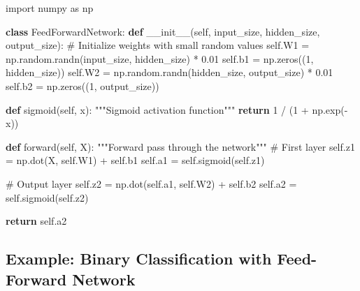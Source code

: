 \documentclass[
  letterpaper,
  DIV=11,
  numbers=noendperiod]{scrreprt}
\newenvironment{Shaded}{\begin{snugshade}}{\end{snugshade}}
\newcommand{\CommentTok}[1]{\textcolor[rgb]{0.37,0.37,0.37}{#1}}
\newcommand{\ControlFlowTok}[1]{\textcolor[rgb]{0.00,0.23,0.31}{\textbf{#1}}}
\newcommand{\DecValTok}[1]{\textcolor[rgb]{0.68,0.00,0.00}{#1}}
\newcommand{\FloatTok}[1]{\textcolor[rgb]{0.68,0.00,0.00}{#1}}
\newcommand{\FunctionTok}[1]{\textcolor[rgb]{0.28,0.35,0.67}{#1}}
\newcommand{\ImportTok}[1]{\textcolor[rgb]{0.00,0.46,0.62}{#1}}
\newcommand{\KeywordTok}[1]{\textcolor[rgb]{0.00,0.23,0.31}{\textbf{#1}}}
\newcommand{\NormalTok}[1]{\textcolor[rgb]{0.00,0.23,0.31}{#1}}
\newcommand{\OperatorTok}[1]{\textcolor[rgb]{0.37,0.37,0.37}{#1}}
\newcommand{\VariableTok}[1]{\textcolor[rgb]{0.07,0.07,0.07}{#1}}
\begin{document}
\begin{Shaded}
\begin{Highlighting}[]
\ImportTok{import}\NormalTok{ numpy }\ImportTok{as}\NormalTok{ np}

\KeywordTok{class}\NormalTok{ FeedForwardNetwork:}
    \KeywordTok{def} \FunctionTok{\_\_init\_\_}\NormalTok{(}\VariableTok{self}\NormalTok{, input\_size, hidden\_size, output\_size):}
        \CommentTok{\# Initialize weights with small random values}
        \VariableTok{self}\NormalTok{.W1 }\OperatorTok{=}\NormalTok{ np.random.randn(input\_size, hidden\_size) }\OperatorTok{*} \FloatTok{0.01}
        \VariableTok{self}\NormalTok{.b1 }\OperatorTok{=}\NormalTok{ np.zeros((}\DecValTok{1}\NormalTok{, hidden\_size))}
        \VariableTok{self}\NormalTok{.W2 }\OperatorTok{=}\NormalTok{ np.random.randn(hidden\_size, output\_size) }\OperatorTok{*} \FloatTok{0.01}
        \VariableTok{self}\NormalTok{.b2 }\OperatorTok{=}\NormalTok{ np.zeros((}\DecValTok{1}\NormalTok{, output\_size))}
    
    \KeywordTok{def}\NormalTok{ sigmoid(}\VariableTok{self}\NormalTok{, x):}
        \CommentTok{"""Sigmoid activation function"""}
        \ControlFlowTok{return} \DecValTok{1} \OperatorTok{/}\NormalTok{ (}\DecValTok{1} \OperatorTok{+}\NormalTok{ np.exp(}\OperatorTok{{-}}\NormalTok{x))}
    
    \KeywordTok{def}\NormalTok{ forward(}\VariableTok{self}\NormalTok{, X):}
        \CommentTok{"""Forward pass through the network"""}
        \CommentTok{\# First layer}
        \VariableTok{self}\NormalTok{.z1 }\OperatorTok{=}\NormalTok{ np.dot(X, }\VariableTok{self}\NormalTok{.W1) }\OperatorTok{+} \VariableTok{self}\NormalTok{.b1}
        \VariableTok{self}\NormalTok{.a1 }\OperatorTok{=} \VariableTok{self}\NormalTok{.sigmoid(}\VariableTok{self}\NormalTok{.z1)}
        
        \CommentTok{\# Output layer}
        \VariableTok{self}\NormalTok{.z2 }\OperatorTok{=}\NormalTok{ np.dot(}\VariableTok{self}\NormalTok{.a1, }\VariableTok{self}\NormalTok{.W2) }\OperatorTok{+} \VariableTok{self}\NormalTok{.b2}
        \VariableTok{self}\NormalTok{.a2 }\OperatorTok{=} \VariableTok{self}\NormalTok{.sigmoid(}\VariableTok{self}\NormalTok{.z2)}
        
        \ControlFlowTok{return} \VariableTok{self}\NormalTok{.a2}
\end{Highlighting}
\end{Shaded}

\subsection{Example: Binary Classification with Feed-Forward
Network}\label{example-binary-classification-with-feed-forward-network}
\end{document}
